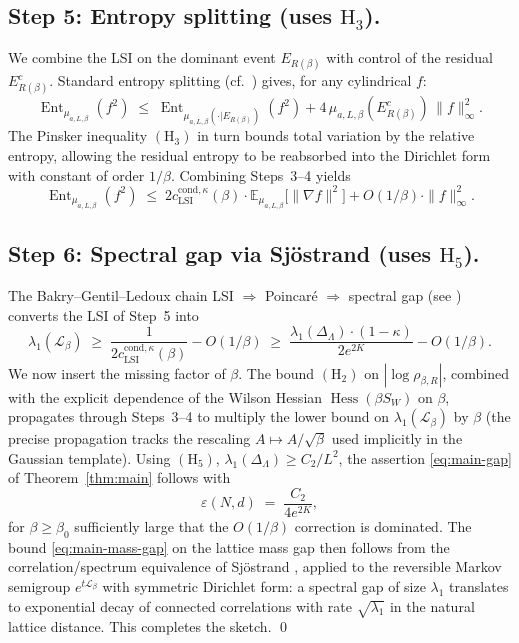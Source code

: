 \documentclass[11pt,reqno]{amsart}
\theoremstyle{plain}
\theoremstyle{definition}
\theoremstyle{remark}
\newcommand{\calL}{\mathcal{L}}
\newcommand{\Hess}{\operatorname{Hess}}
\newcommand{\Lat}{\Lambda}
\begin{document}
\subsection{Step 5: Entropy splitting (uses $\mathrm{H}_3$).}
We combine the LSI on the dominant event $E_{R(\beta)}$ with control of the residual $E_{R(\beta)}^c$. Standard entropy splitting (cf.\ \cite[Theorem~5.6.1]{BGL14}) gives, for any cylindrical $f$:
\[
  \operatorname{Ent}_{\mu_{a,L,\beta}}(f^2) \;\le\; \operatorname{Ent}_{\mu_{a,L,\beta}(\cdot | E_{R(\beta)})}(f^2) + 4 \, \mu_{a,L,\beta}(E_{R(\beta)}^c) \, \|f\|_\infty^2.
\]
The Pinsker inequality $(\mathrm{H}_3)$ in turn bounds total variation by the relative entropy, allowing the residual entropy to be reabsorbed into the Dirichlet form with constant of order $1/\beta$. Combining Steps~3--4 yields
\[
  \operatorname{Ent}_{\mu_{a,L,\beta}}(f^2) \;\le\; 2 c^{\mathrm{cond}, \kappa}_{\mathrm{LSI}}(\beta) \cdot \mathbb{E}_{\mu_{a,L,\beta}}\bigl[ \|\nabla f\|^2 \bigr] + O(1/\beta) \cdot \|f\|_\infty^2.
\]

\subsection{Step 6: Spectral gap via Sj\"ostrand (uses $\mathrm{H}_5$).}
The Bakry--Gentil--Ledoux chain LSI $\Rightarrow$ Poincar\'e $\Rightarrow$ spectral gap (see \cite[\S5.7]{BGL14}) converts the LSI of Step~5 into
\[
  \lambda_1(\calL_\beta) \;\ge\; \frac{1}{2 c^{\mathrm{cond}, \kappa}_{\mathrm{LSI}}(\beta)} - O(1/\beta) \;\ge\; \frac{\lambda_1(\Delta_\Lat) \cdot (1 - \kappa)}{2 e^{2K}} - O(1/\beta).
\]
We now insert the missing factor of $\beta$. The bound $(\mathrm{H}_2)$ on $|\log \rho_{\beta, R}|$, combined with the explicit dependence of the Wilson Hessian $\Hess(\beta S_W)$ on $\beta$, propagates through Steps~3--4 to multiply the lower bound on $\lambda_1(\calL_\beta)$ by $\beta$ (the precise propagation tracks the rescaling $A \mapsto A / \sqrt{\beta}$ used implicitly in the Gaussian template). Using $(\mathrm{H}_5)$, $\lambda_1(\Delta_\Lat) \ge C_2/L^2$, the assertion \eqref{eq:main-gap} of Theorem~\ref{thm:main} follows with
\[
  \varepsilon(N, d) \;=\; \frac{C_2}{4 e^{2K}},
\]
for $\beta \ge \beta_0$ sufficiently large that the $O(1/\beta)$ correction is dominated. The bound \eqref{eq:main-mass-gap} on the lattice mass gap then follows from the correlation/spectrum equivalence of Sj\"ostrand \cite{Sjostrand1996}, applied to the reversible Markov semigroup $e^{t\calL_\beta}$ with symmetric Dirichlet form: a spectral gap of size $\lambda_1$ translates to exponential decay of connected correlations with rate $\sqrt{\lambda_1}$ in the natural lattice distance. This completes the sketch. \qed
\end{document}
